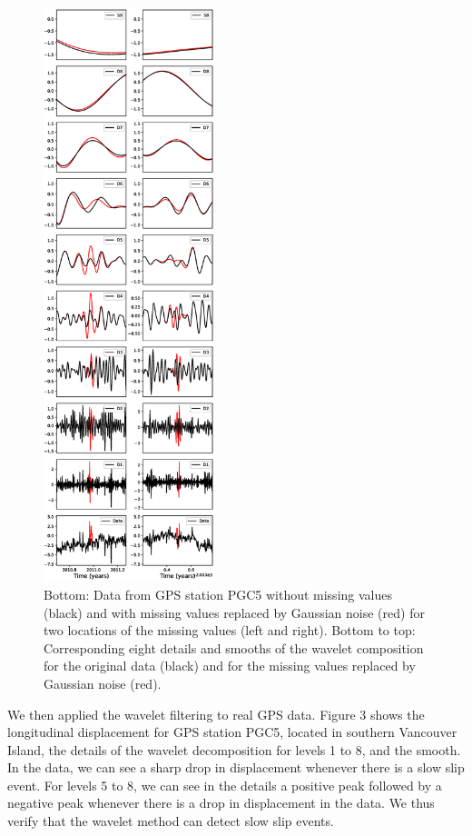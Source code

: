 \documentclass[draft]{agujournal2018}
\begin{document}
\begin{figure}
\noindent\includegraphics[width=5cm, trim={0cm 0cm 0cm 0cm},clip]{figures/DS_10.eps}
\caption{Bottom: Data from GPS station PGC5 without missing values (black) and with missing values replaced by Gaussian noise (red) for two locations of the missing values (left and right). Bottom to top: Corresponding eight details and smooths of the wavelet composition for the original data (black) and for the missing values replaced by Gaussian noise (red).}
\label{pngfiguresample}
\end{figure}

We then applied the wavelet filtering to real GPS data. Figure 3 shows the longitudinal displacement for GPS station PGC5, located in southern Vancouver Island, the details of the wavelet decomposition for levels 1 to 8, and the smooth. In the data, we can see a sharp drop in displacement whenever there is a slow slip event. For levels 5 to 8, we can see in the details a positive peak followed by a negative peak whenever there is a drop in displacement in the data. We thus verify that the wavelet method can detect slow slip events. \\
\end{document}
